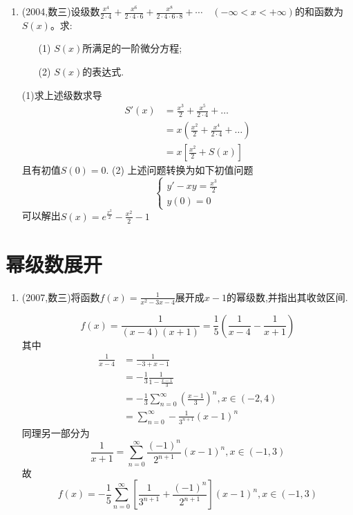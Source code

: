 \documentclass[12pt, a4paper, oneside, UTF8]{ctexbook}
\begin{document}
\begin{enumerate}[label=\arabic*.,start=8]
    \item (2004,数三)设级数$\frac{x^4}{2\cdot 4}+\frac{x^6}{2\cdot 4\cdot 6}+\frac{x^8}{2\cdot 4\cdot 6\cdot 8}+\cdots\quad(-\infty<x<+\infty)$的和函数为$S(x)$。求:
    \begin{enumerate}[label=(\roman*)]
        \item[(1)] $S(x)$所满足的一阶微分方程;
        \item[(2)] $S(x)$的表达式.
    \end{enumerate}
    
    \begin{solution}
    (1)求上述级数求导
    \begin{align*}
        S'(x) &= \frac{x^3}{2} + \frac{x^5}{2\cdot 4} + \ldots \\
        &= x\left(\frac{x^2}{2}+\frac{x^4}{2\cdot 4}+\ldots\right) \\
        &=x\left[\frac{x^2}{2}+S(x)\right] 
    \end{align*}
    且有初值$S(0)=0$.
    (2) 上述问题转换为如下初值问题 
    $$
    \begin{cases}
        y' - xy = \frac{x^3}{2} \\
        y(0) = 0
    \end{cases}
    $$
    可以解出$S(x)=e^{\frac{x^2}{2}}-\frac{x^2}{2}-1$
    \end{solution}
\end{enumerate}

\section{幂级数展开}

\begin{enumerate}[label=\arabic*.,start=11]
    \item (2007,数三)将函数$f(x)=\frac{1}{x^2-3x-4}$展开成$x-1$的幂级数,并指出其收敛区间.
    
    \begin{solution}
    $$
        f(x) =\frac{1}{(x-4)(x+1)} = \frac{1}{5}\left(\frac{1}{x-4}-\frac{1}{x+1}\right)
    $$
    其中
    \begin{align*}
        \frac{1}{x-4} &=\frac{1}{-3+x-1} \\ 
        &= -\frac{1}{3}\frac{1}{1-\frac{x-1}{3}} \\ 
        &=-\frac{1}{3}\sum_{n=0}^{\infty}\left(\frac{x-1}{3}\right)^n, x\in(-2,4) \\
        &=\sum_{n=0}^{\infty}-\frac{1}{3^{n+1}}(x-1)^n
    \end{align*}
    同理另一部分为
    $$
    \frac{1}{x+1} = \sum_{n=0}^{\infty}\frac{(-1)^n}{2^{n+1}}(x-1)^n, x\in(-1,3)
    $$
    故
    $$
    f(x)=-\frac{1}{5}\sum_{n=0}^{\infty}\left[\frac{1}{3^{n+1}}+\frac{(-1)^n}{2^{n+1}}\right](x-1)^n, x\in(-1,3)
    $$

    \end{solution}
    
\end{enumerate}
\end{document}
